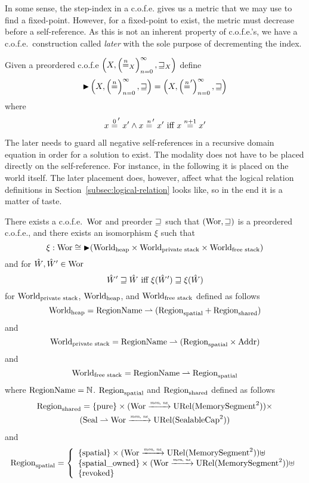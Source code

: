 \begin{jversion}
In some sense, the step-index in a c.o.f.e. gives us a metric that we may use to find a fixed-point.
However, for a fixed-point to exist, the metric must decrease before a self-reference.
As this is not an inherent property of c.o.f.e.'s, we have a c.o.f.e.\ construction called \emph{later} with the sole purpose of decrementing the index.
\begin{lemma}
  Given a preordered c.o.f.e $\left(X, \left(\nequal_X\right)_{n=0}^{\infty}, \future_X \right)$ define
  \[
    \blater\left(X, \left(\nequal\right)_{n=0}^{\infty}, \future \right) = \left(X, \left(\nequal[n]'\right)_{n=0}^{\infty}, \future \right)
  \]
  where
  \[
    x \nequal[0]' x' \wedge x \nequal[n]' x' \text{ iff } x \nequal[n+1] x'
  \]
\end{lemma}
The later needs to guard all negative self-references in a recursive domain equation in order for a solution to exist.
The modality does not have to be placed directly on the self-reference.
For instance, in the following it is placed on the world itself.
The later placement does, however, affect what the logical relation definitions in Section~\ref{subsec:logical-relation} looks like, so in the end it is a matter of taste.
\begin{theorem}
  \label{thm:rec-dom-eq-sol}
  There exists a c.o.f.e.\ $\Wor$ and preorder $\future$ such that $(\Wor,\future)$ is a preordered c.o.f.e., and there exists an isomorphism $\xi$ such that
  \[
    \xi : \Wor \cong \blater (\Worldh \times \Worlds \times \Worldfs)
  \]
  and for $\hat{W},\hat{W}' \in \Wor$
  \[
    \hat{W}' \future \hat{W} \text{ iff } \xi(\hat{W}') \future \xi(\hat{W})
  \]
  for $\Worlds$, $\Worldh$, and $\Worldfs$ defined as follows
\[
  \Worldh = \RegionName \parfun (\Regions + \Regionh)
\]
and
\[
  \Worlds = \RegionName \parfun (\Regions \times \Addr)
\]
and
\[
  \Worldfs = \RegionName \parfun \Regions
\]
where $\RegionName = \nats$. $\Regions$ and $\Regionh$ defined as follows
\begin{multline*}
  \Regionh = 
  \{\pure \} \times (\Wor \monnefun \URel{\MemSeg^2}) \times \\
  (\Seal \parfun \Wor \monnefun \URel{\SealableCaps^2})
\end{multline*}
and
\[
  \Regions = \left\{
  \begin{array}{l}
    \{\spatial \} \times (\Wor \monnefun \URel{\MemSeg^2}) \uplus \\
    \{\spatialo \} \times (\Wor \monnefun \URel{\MemSeg^2})\uplus \\ 
    \{\revoked\}
  \end{array} \right.
\]
\end{theorem}


\end{jversion}
